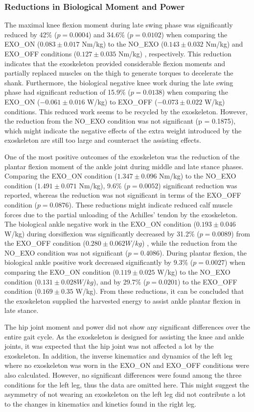\documentclass[twocolumn,cleanfoot,10pt]{asme2ej}
\begin{document}
\subsubsection{Reductions in Biological Moment and Power}
The maximal knee flexion moment during late swing phase was significantly reduced by 42\% ($p = 0.0004$) and 34.6\% ($p = 0.0102$) when comparing the EXO\_ON ($0.083\pm0.017$ Nm/kg) to the NO\_EXO ($0.143\pm0.032$ Nm/kg) and EXO\_OFF conditions ($0.127\pm0.035$ Nm/kg) , respectively.
This reduction indicates that the exoskeleton provided considerable flexion moments and partially replaced muscles on the thigh to generate torques to decelerate the shank.
Furthermore, the biological negative knee work during the late swing phase had significant reduction of 15.9\% ($p = 0.0138$) when comparing the EXO\_ON ($-0.061\pm0.016$ W/kg) to EXO\_OFF ($-0.073\pm0.022$ W/kg) conditions.
This reduced work seems to be recycled by the exoskeleton. However, the reduction from the NO\_EXO condition was not significant (p = 0.1875), which might indicate the negative effects of the extra weight introduced by the exoskeleton are still too large and counteract the assisting effects.

One of the most positive outcomes of the exoskeleton was the reduction of the plantar flexion moment of the ankle joint during middle and late stance phases.
Comparing the EXO\_ON condition ($1.347\pm0.096$ Nm/kg) to the NO\_EXO condition ($1.491\pm0.071$ Nm/kg), 9.6\% ($p = 0.0052$) significant reduction was reported, whereas the reduction was not significant in terms of the EXO\_OFF  condition ($p = 0.0876$).
These reductions might indicate reduced calf muscle forces due to the partial unloading of the Achilles’ tendon by the exoskeleton.
The biological ankle negative work in the EXO\_ON condition ($0.193\pm0.046$ W/kg) during dorsiflexion was significantly decreased by 31.2\% ($p = 0.0089$) from the EXO\_OFF condition ($0.280\pm0.062 W/kg$) , while the reduction from the NO\_EXO condition was not significant ($p = 0.4086$).
During plantar flexion, the biological ankle positive work decreased significantly by 9.3\% ($p = 0.0027$) when comparing the EXO\_ON condition ($0.119\pm0.025$ W/kg) to the NO\_EXO condition ($0.131\pm0.028 W/kg$), and by 29.7\% ($p = 0.0201$) to the EXO\_OFF condition ($0.169\pm0.35$ W/kg).
From these reductions, it can be concluded that the exoskeleton supplied the harvested energy to assist ankle plantar flexion in late stance. 

The hip joint moment and power did not show any significant differences over the entire gait cycle.
As the exoskeleton is designed for assisting the knee and ankle joints, it was expected that the hip joint was not affected a lot by the exoskeleton.
In addition, the inverse kinematics and dynamics of the left leg where no exoskeleton was worn in the EXO\_ON and EXO\_OFF conditions were also calculated.
However, no significant differences were found among the three conditions for the left leg, thus the data are omitted here.
This might suggest the asymmetry of not wearing an exoskeleton on the left leg did not contribute a lot to the changes in kinematics and kinetics found in the right leg.
\end{document}
